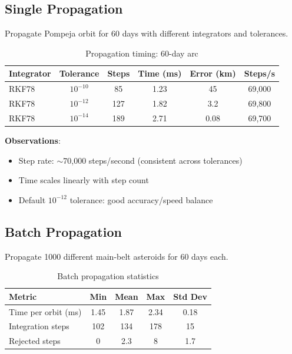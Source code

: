 \subsection{Single Propagation}

Propagate Pompeja orbit for 60 days with different integrators and tolerances.

\begin{table}[h]
\centering
\caption{Propagation timing: 60-day arc}
\begin{tabular}{lccccc}
\hline
\textbf{Integrator} & \textbf{Tolerance} & \textbf{Steps} & \textbf{Time (ms)} & \textbf{Error (km)} & \textbf{Steps/s} \\
\hline
RKF78 & $10^{-10}$ & 85 & 1.23 & 45 & 69,000 \\
RKF78 & $10^{-12}$ & 127 & 1.82 & 3.2 & 69,800 \\
RKF78 & $10^{-14}$ & 189 & 2.71 & 0.08 & 69,700 \\
\hline
\end{tabular}
\end{table}

\textbf{Observations}:
\begin{itemize}
    \item Step rate: $\sim$70,000 steps/second (consistent across tolerances)
    \item Time scales linearly with step count
    \item Default $10^{-12}$ tolerance: good accuracy/speed balance
\end{itemize}

\subsection{Batch Propagation}

Propagate 1000 different main-belt asteroids for 60 days each.

\begin{table}[h]
\centering
\caption{Batch propagation statistics}
\begin{tabular}{lcccc}
\hline
\textbf{Metric} & \textbf{Min} & \textbf{Mean} & \textbf{Max} & \textbf{Std Dev} \\
\hline
Time per orbit (ms) & 1.45 & 1.87 & 2.34 & 0.18 \\
Integration steps & 102 & 134 & 178 & 15 \\
Rejected steps & 0 & 2.3 & 8 & 1.7 \\
\hline
\end{tabular}
\end{table}

